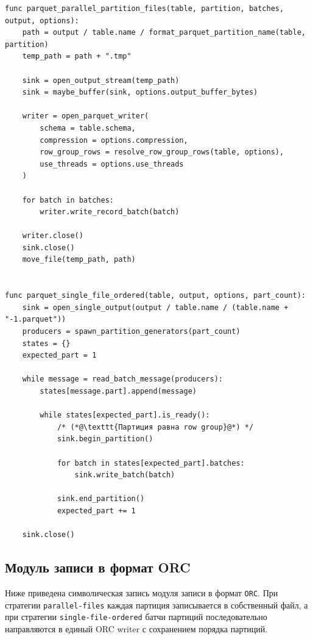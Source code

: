 \begin{lstlisting}[caption={Запись таблицы в формат Parquet}]
func parquet_parallel_partition_files(table, partition, batches, output, options):
    path = output / table.name / format_parquet_partition_name(table, partition)
    temp_path = path + ".tmp"

    sink = open_output_stream(temp_path)
    sink = maybe_buffer(sink, options.output_buffer_bytes)

    writer = open_parquet_writer(
        schema = table.schema,
        compression = options.compression,
        row_group_rows = resolve_row_group_rows(table, options),
        use_threads = options.use_threads
    )

    for batch in batches:
        writer.write_record_batch(batch)

    writer.close()
    sink.close()
    move_file(temp_path, path)


func parquet_single_file_ordered(table, output, options, part_count):
    sink = open_single_output(output / table.name / (table.name + "-1.parquet"))
    producers = spawn_partition_generators(part_count)
    states = {}
    expected_part = 1

    while message = read_batch_message(producers):
        states[message.part].append(message)

        while states[expected_part].is_ready():
            /* (*@\texttt{Партиция равна row group}@*) */
            sink.begin_partition()

            for batch in states[expected_part].batches:
                sink.write_batch(batch)

            sink.end_partition()
            expected_part += 1

    sink.close()
\end{lstlisting}

\subsection{Модуль записи в формат ORC}

Ниже приведена символическая запись модуля записи в формат \texttt{ORC}. При
стратегии \texttt{parallel-files} каждая партиция записывается в собственный
файл, а при стратегии \texttt{single-file-ordered} батчи партиций
последовательно направляются в единый ORC writer с сохранением порядка
партиций.

